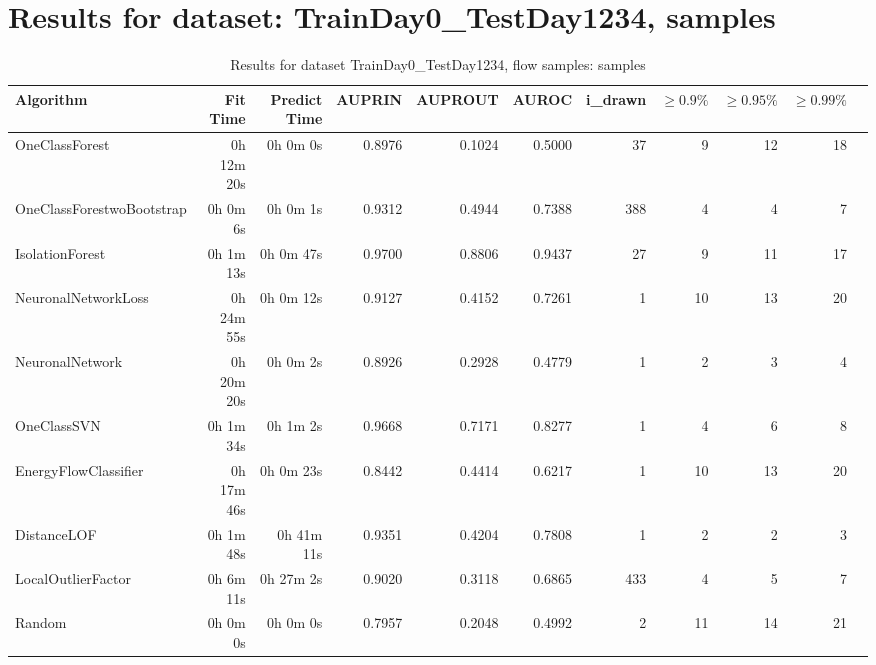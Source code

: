 \documentclass{article}
\begin{document}
\section*{Results for dataset: TrainDay0_TestDay1234, samples}
\begin{table}[h!]
\centering
\caption{Results for dataset TrainDay0_TestDay1234, flow samples: samples}
\begin{tabular}{lrrrrrrrrrr}
\toprule
Algorithm & Fit Time & Predict Time & AUPRIN & AUPROUT & AUROC & i\_drawn & $\geq 0.9\%$ & $\geq 0.95\%$ & $\geq 0.99\%$ \\
\midrule
OneClassForest & 0h 12m 20s & 0h 0m 0s & 0.8976 & 0.1024 & 0.5000 & 37 & 9 & 12 & 18 \\
OneClassForestwoBootstrap & 0h 0m 6s & 0h 0m 1s & 0.9312 & 0.4944 & 0.7388 & 388 & 4 & 4 & 7 \\
IsolationForest & 0h 1m 13s & 0h 0m 47s & 0.9700 & 0.8806 & 0.9437 & 27 & 9 & 11 & 17 \\
NeuronalNetworkLoss & 0h 24m 55s & 0h 0m 12s & 0.9127 & 0.4152 & 0.7261 & 1 & 10 & 13 & 20 \\
NeuronalNetwork & 0h 20m 20s & 0h 0m 2s & 0.8926 & 0.2928 & 0.4779 & 1 & 2 & 3 & 4 \\
OneClassSVN & 0h 1m 34s & 0h 1m 2s & 0.9668 & 0.7171 & 0.8277 & 1 & 4 & 6 & 8 \\
EnergyFlowClassifier & 0h 17m 46s & 0h 0m 23s & 0.8442 & 0.4414 & 0.6217 & 1 & 10 & 13 & 20 \\
DistanceLOF & 0h 1m 48s & 0h 41m 11s & 0.9351 & 0.4204 & 0.7808 & 1 & 2 & 2 & 3 \\
LocalOutlierFactor & 0h 6m 11s & 0h 27m 2s & 0.9020 & 0.3118 & 0.6865 & 433 & 4 & 5 & 7 \\
Random & 0h 0m 0s & 0h 0m 0s & 0.7957 & 0.2048 & 0.4992 & 2 & 11 & 14 & 21 \\
\bottomrule
\end{tabular}
\end{table}
\end{document}
